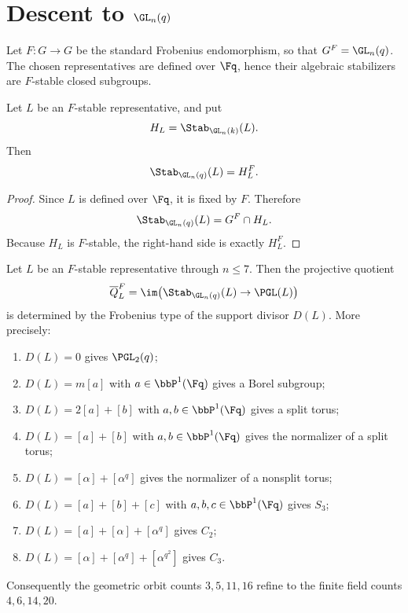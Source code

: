 \section{Descent to \texorpdfstring{$\GL_n(q)$}{GLn(q)}}
\label{sec:lang-steinberg}

Let \(F:G\to G\) be the standard Frobenius endomorphism, so that
\(G^F=\GL_n(q)\). The chosen representatives are defined over \(\Fq\), hence
their algebraic stabilizers are \(F\)-stable closed subgroups.

\begin{proposition}
\label{prop:fixed-point-stabilizer}
Let \(L\) be an \(F\)-stable representative, and put
\[
  H_L=\Stab_{\GL_n(k)}(L).
\]
Then
\[
  \Stab_{\GL_n(q)}(L)=H_L^F.
\]
\end{proposition}

\begin{proof}
Since \(L\) is defined over \(\Fq\), it is fixed by \(F\). Therefore
\[
  \Stab_{\GL_n(q)}(L)=G^F\cap H_L.
\]
Because \(H_L\) is \(F\)-stable, the right-hand side is exactly \(H_L^F\).
\end{proof}

\begin{theorem}
\label{thm:frobenius-projective-quotients}
Let \(L\) be an \(F\)-stable representative through \(n\leq 7\). Then the
projective quotient
\[
  \overline{Q}_L^F
  =
  \im\bigl(\Stab_{\GL_n(q)}(L)\to \PGL(L)\bigr)
\]
is determined by the Frobenius type of the support divisor \(D(L)\). More
precisely:
\begin{enumerate}[label=\arabic*.]
\item \(D(L)=0\) gives \(\PGL_2(q)\);
\item \(D(L)=m[a]\) with \(a\in \bbP^1(\Fq)\) gives a Borel subgroup;
\item \(D(L)=2[a]+[b]\) with \(a,b\in \bbP^1(\Fq)\) gives a split torus;
\item \(D(L)=[a]+[b]\) with \(a,b\in \bbP^1(\Fq)\) gives the normalizer of a
  split torus;
\item \(D(L)=[\alpha]+[\alpha^q]\) gives the normalizer of a nonsplit torus;
\item \(D(L)=[a]+[b]+[c]\) with \(a,b,c\in \bbP^1(\Fq)\) gives \(S_3\);
\item \(D(L)=[a]+[\alpha]+[\alpha^q]\) gives \(C_2\);
\item \(D(L)=[\alpha]+[\alpha^q]+[\alpha^{q^2}]\) gives \(C_3\).
\end{enumerate}
Consequently the geometric orbit counts \(3,5,11,16\) refine to the finite
field counts \(4,6,14,20\).
\end{theorem}

